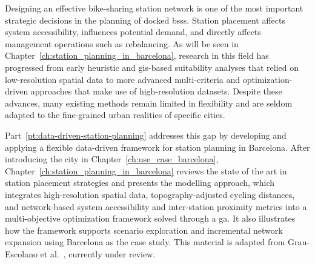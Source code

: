 Designing an effective bike-sharing station network is one of the most important strategic decisions in the planning of docked \acp{bss}. Station placement affects system accessibility, influences potential demand, and directly affects management operations such as rebalancing. As will be seen in Chapter~\ref{ch:station_planning_in_barcelona}, research in this field has progressed from early heuristic and \ac{gis}-based suitability analyses that relied on low-resolution spatial data to more advanced multi-criteria and optimization-driven approaches that make use of high-resolution datasets. Despite these advances, many existing methods remain limited in flexibility and are seldom adapted to the fine-grained urban realities of specific cities.

Part~\ref{pt:data-driven-station-planning} addresses this gap by developing and applying a flexible data-driven framework for station planning in Barcelona. After introducing the city in Chapter~\ref{ch:use_case_barcelona}, Chapter~\ref{ch:station_planning_in_barcelona} reviews the state of the art in station placement strategies and presents the modelling approach, which integrates high-resolution spatial data, topography-adjusted cycling distances, and network-based system accessibility and inter-station proximity metrics into a multi-objective optimization framework solved through a \ac{ga}. It also illustrates how the framework supports scenario exploration and incremental network expansion using Barcelona as the case study. This material is adapted from Grau-Escolano et al.~\cite{GrauEscolano2025}, currently under review.